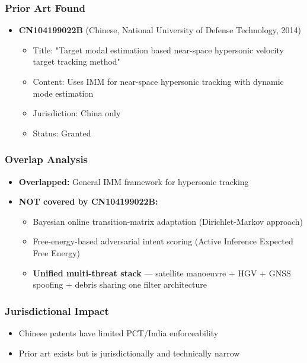 \documentclass[11pt,a4paper]{article}
\begin{document}
\subsubsection*{Prior Art Found}
\begin{itemize}
\item \textbf{CN104199022B} (Chinese, National University of Defense Technology, 2014)
  \begin{itemize}
  \item Title: "Target modal estimation based near-space hypersonic velocity target tracking method"
  \item Content: Uses IMM for near-space hypersonic tracking with dynamic mode estimation
  \item Jurisdiction: China only
  \item Status: Granted
  \end{itemize}
\end{itemize}

\subsubsection*{Overlap Analysis}
\begin{itemize}
\item \textbf{Overlapped:} General IMM framework for hypersonic tracking
\item \textbf{NOT covered by CN104199022B:}
  \begin{itemize}
  \item Bayesian online transition-matrix adaptation (Dirichlet-Markov approach)
  \item Free-energy-based adversarial intent scoring (Active Inference Expected Free Energy)
  \item \textbf{Unified multi-threat stack} — satellite manoeuvre + HGV + GNSS spoofing + debris sharing one filter architecture
  \end{itemize}
\end{itemize}

\subsubsection*{Jurisdictional Impact}
\begin{itemize}
\item Chinese patents have limited PCT/India enforceability
\item Prior art exists but is jurisdictionally and technically narrow
\end{itemize}
\end{document}
